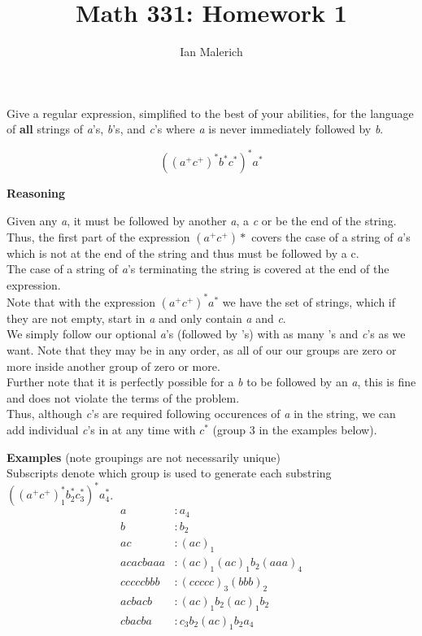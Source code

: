 \documentclass[12pt]{jhwhw}
\author{Ian Malerich}
\title{Math 331: Homework 1}
\begin{document}
\raggedright{}

\problem{}

	Give a regular expression, simplified to the best of your abilities, for the language of \textbf{all} strings
	of \textit{a}'s, \textit{b}'s, and \textit{c}'s where \textit{a} is never immediately followed by \textit{b}.

\solution



	$$
		(
		(a^+c^+)^*
		b^*c^*
		)^*a^*
	$$

	\textbf{Reasoning}

	Given any \textit{a}, it must be followed by another \textit{a}, a \textit{c} or be the end of the string.
	Thus, the first part of the expression $(a^+c^+)*$ covers the case of a string of \textit{a}'s which
	is not at the end of the string and thus must be followed by a c.
	\\
	The case of a string of \textit{a}'s terminating the string is covered at the end of the expression.
	\\
	Note that with the expression $(a^+c^+)^*a^*$ we have the set of strings, which if they are not empty,
	start in \textit{a} and only contain \textit{a} and \textit{c}.
	\\
	We simply follow our optional \textit{a}'s (followed by 's) with as many 's and 
	\textit{c}'s as we want. Note that they may be in any order, as all of our our groups are zero or more
	inside another group of zero or more.
	\\
	Further note that it is perfectly possible for a \textit{b} to be followed by an \textit{a}, this is fine
	and does not violate the terms of the problem.
	\\
	Thus, although \textit{c}'s are required following occurences of \textit{a} in the string, we can add
	individual \textit{c}'s in at any time with $\textit{c}^*$ (group 3 in the examples below).

	\bigbreak
	\textbf{Examples} (note groupings are not necessarily unique) \\
	Subscripts denote which group is used to generate each substring $((a^+c^+)_1^*b^*_2c^*_3)^*a^*_4$. \\
	\begin{align*}
		a &: a_4 \\
		b &: b_2 \\
		ac &: (ac)_1 \\
		acacbaaa &: (ac)_1(ac)_1b_2(aaa)_4 \\
		cccccbbb &: (ccccc)_3(bbb)_2 \\
		acbacb &: (ac)_1b_2(ac)_1b_2 \\
		cbacba &: c_3b_2(ac)_1b_2a_4 \\
	\end{align*}
\end{document}
